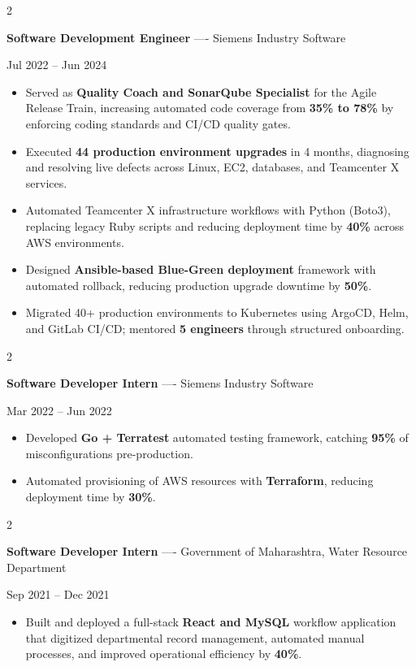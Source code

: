 \documentclass[10pt, letterpaper]{article}
\newenvironment{highlights}{
    \begin{itemize}[
        topsep=0.10 cm,
        parsep=0.06 cm,
        partopsep=0pt,
        itemsep=0.06 cm,
        leftmargin=12pt
    ]
}{
    \end{itemize}
}
\newenvironment{twocolentry}[2][]{
    \onecolentry
    \def\secondColumn{#2}
    \setcolumnwidth{\fill, 4.5 cm}
    \begin{paracol}{2}
}{
    \switchcolumn \raggedleft \secondColumn
    \end{paracol}
    \endonecolentry
}
\begin{document}
\vspace{0.15 cm}

\begin{twocolentry}{Jul 2022 -- Jun 2024}
\textbf{Software Development Engineer} ---- Siemens Industry Software
\end{twocolentry}
\begin{highlights}
  \item Served as \textbf{Quality Coach and SonarQube Specialist} for the Agile Release Train, increasing automated code coverage from \textbf{35\% to 78\%} by enforcing coding standards and CI/CD quality gates.
  \item Executed \textbf{44 production environment upgrades} in 4 months, diagnosing and resolving live defects across Linux, EC2, databases, and Teamcenter X services.
  \item Automated Teamcenter X infrastructure workflows with Python (Boto3), replacing legacy Ruby scripts and reducing deployment time by \textbf{40\%} across AWS environments.
  \item Designed \textbf{Ansible-based Blue-Green deployment} framework with automated rollback, reducing production upgrade downtime by \textbf{50\%}.
  \item Migrated 40+ production environments to Kubernetes using ArgoCD, Helm, and GitLab CI/CD; mentored \textbf{5 engineers} through structured onboarding.
\end{highlights}

\vspace{0.15 cm}

\begin{twocolentry}{Mar 2022 -- Jun 2022}
\textbf{Software Developer Intern} ---- Siemens Industry Software
\end{twocolentry}
\begin{highlights}
  \item Developed \textbf{Go + Terratest} automated testing framework, catching \textbf{95\%} of misconfigurations pre-production.
  \item Automated provisioning of AWS resources with \textbf{Terraform}, reducing deployment time by \textbf{30\%}.
\end{highlights}

\vspace{0.15 cm}

\begin{twocolentry}{Sep 2021 -- Dec 2021}
\textbf{Software Developer Intern} ---- Government of Maharashtra, Water Resource Department
\end{twocolentry}
\begin{highlights}
  \item Built and deployed a full-stack \textbf{React and MySQL} workflow application that digitized departmental record management, automated manual processes, and improved operational efficiency by \textbf{40\%}.
\end{highlights}
\end{document}
